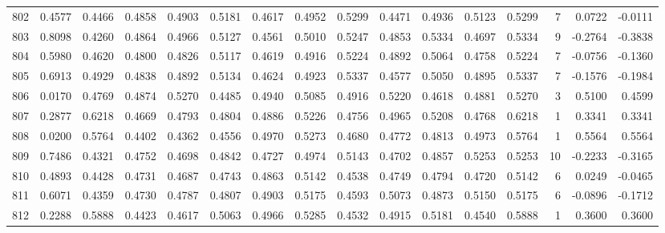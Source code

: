 \begin{tabular}{lrrrrrrrrrrrrrrr}
802 &      0.4577 &  0.4466 &  0.4858 &  0.4903 &  0.5181 &  0.4617 &  0.4952 &  0.5299 &  0.4471 &  0.4936 &   0.5123 &     0.5299 &      7 &                    0.0722 &                    -0.0111 \\
803 &      0.8098 &  0.4260 &  0.4864 &  0.4966 &  0.5127 &  0.4561 &  0.5010 &  0.5247 &  0.4853 &  0.5334 &   0.4697 &     0.5334 &      9 &                   -0.2764 &                    -0.3838 \\
804 &      0.5980 &  0.4620 &  0.4800 &  0.4826 &  0.5117 &  0.4619 &  0.4916 &  0.5224 &  0.4892 &  0.5064 &   0.4758 &     0.5224 &      7 &                   -0.0756 &                    -0.1360 \\
805 &      0.6913 &  0.4929 &  0.4838 &  0.4892 &  0.5134 &  0.4624 &  0.4923 &  0.5337 &  0.4577 &  0.5050 &   0.4895 &     0.5337 &      7 &                   -0.1576 &                    -0.1984 \\
806 &      0.0170 &  0.4769 &  0.4874 &  0.5270 &  0.4485 &  0.4940 &  0.5085 &  0.4916 &  0.5220 &  0.4618 &   0.4881 &     0.5270 &      3 &                    0.5100 &                     0.4599 \\
807 &      0.2877 &  0.6218 &  0.4669 &  0.4793 &  0.4804 &  0.4886 &  0.5226 &  0.4756 &  0.4965 &  0.5208 &   0.4768 &     0.6218 &      1 &                    0.3341 &                     0.3341 \\
808 &      0.0200 &  0.5764 &  0.4402 &  0.4362 &  0.4556 &  0.4970 &  0.5273 &  0.4680 &  0.4772 &  0.4813 &   0.4973 &     0.5764 &      1 &                    0.5564 &                     0.5564 \\
809 &      0.7486 &  0.4321 &  0.4752 &  0.4698 &  0.4842 &  0.4727 &  0.4974 &  0.5143 &  0.4702 &  0.4857 &   0.5253 &     0.5253 &     10 &                   -0.2233 &                    -0.3165 \\
810 &      0.4893 &  0.4428 &  0.4731 &  0.4687 &  0.4743 &  0.4863 &  0.5142 &  0.4538 &  0.4749 &  0.4794 &   0.4720 &     0.5142 &      6 &                    0.0249 &                    -0.0465 \\
811 &      0.6071 &  0.4359 &  0.4730 &  0.4787 &  0.4807 &  0.4903 &  0.5175 &  0.4593 &  0.5073 &  0.4873 &   0.5150 &     0.5175 &      6 &                   -0.0896 &                    -0.1712 \\
812 &      0.2288 &  0.5888 &  0.4423 &  0.4617 &  0.5063 &  0.4966 &  0.5285 &  0.4532 &  0.4915 &  0.5181 &   0.4540 &     0.5888 &      1 &                    0.3600 &                     0.3600 \\

\end{tabular}
